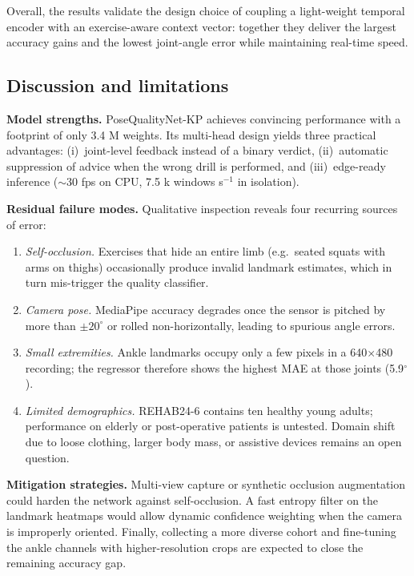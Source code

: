 \documentclass{article}
\begin{document}
\begin{enumerate}[label=\textbf{\Alph*.}, leftmargin=2em, itemsep=6pt]
Overall, the results validate the design choice of coupling a
light-weight temporal encoder with an exercise-aware context vector:
together they deliver the largest accuracy gains and the lowest
joint-angle error while maintaining real-time speed.


\subsection{Discussion and limitations}
\label{sec:limit}
\textbf{Model strengths.}  
PoseQualityNet-KP achieves convincing performance with a footprint of
only 3.4 M weights.  Its multi-head design yields three practical
advantages:  
(i)~joint-level feedback instead of a binary verdict,  
(ii)~automatic suppression of advice when the wrong drill is performed,
and  
(iii)~edge-ready inference (\(\sim\)30 fps on CPU, 7.5 k windows s\(^{-1}\)
in isolation).

\textbf{Residual failure modes.}  
Qualitative inspection reveals four recurring sources of error:
\begin{enumerate}[label=(\alph*),leftmargin=1.6em,itemsep=3pt]
  \item \emph{Self-occlusion.}  Exercises that hide an entire limb
        (e.g.\ seated squats with arms on thighs) occasionally produce
        invalid landmark estimates, which in turn mis-trigger the
        quality classifier.
  \item \emph{Camera pose.}  MediaPipe accuracy degrades once the sensor
        is pitched by more than \(\pm20^{\circ}\) or rolled
        non-horizontally, leading to spurious angle errors.
  \item \emph{Small extremities.}  Ankle landmarks occupy only a few
        pixels in a 640\(\times\)480 recording; the regressor therefore
        shows the highest MAE at those joints (5.9\(^{\circ}\)).
  \item \emph{Limited demographics.}  REHAB24-6 contains ten healthy
        young adults; performance on elderly or post-operative patients
        is untested.  Domain shift due to loose clothing, larger body
        mass, or assistive devices remains an open question.
\end{enumerate}

\textbf{Mitigation strategies.}  
Multi-view capture or synthetic occlusion augmentation could harden the
network against self-occlusion.  A fast entropy filter on the landmark
heatmaps would allow dynamic confidence weighting when the camera is
improperly oriented.  Finally, collecting a more diverse cohort and
fine-tuning the ankle channels with higher-resolution crops are expected
to close the remaining accuracy gap.


\end{enumerate}
\end{document}
